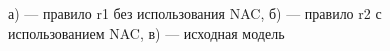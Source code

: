 \documentclass[a5paper]{article}
\begin{document}
\begin{figure}[h]
\begin{minipage}[h]{0.49\linewidth}
\end{minipage}
\begin{minipage}[h]{0.49\linewidth}
\end{minipage}
\begin{center}
\begin{minipage}[h]{0.49\linewidth}
\end{minipage}
\end{center}
\caption{а) — правило r1 без использования NAC, б) — правило r2 с использованием NAC, в) — исходная модель}
\label{fig6}
\end{figure}
\end{document}
